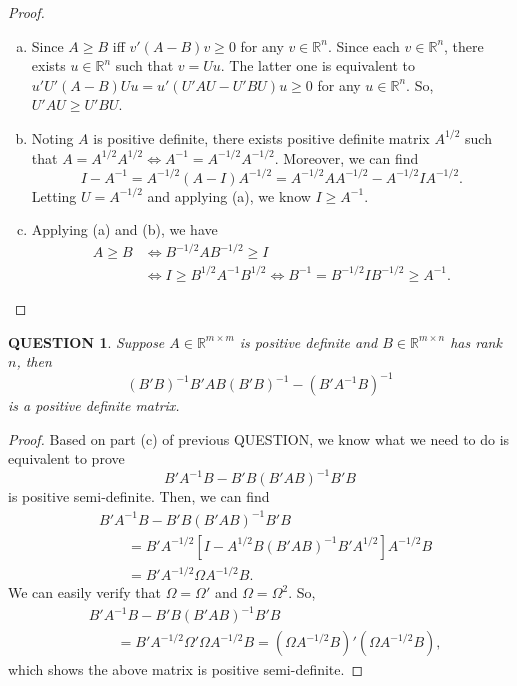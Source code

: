 \documentclass[12pt]{article}
\renewcommand{\(}{\left(}%
\renewcommand{\)}{\right)}%
\renewcommand{\[}{\left[}%
\renewcommand{\]}{\right]}%
\renewcommand{\r}{\mathbb{R}}
\newtheorem{question}{QUESTION}[section]}
\newtheorem{proof}{Proof.}}
\begin{document}
\begin{proof}
	\begin{enumerate}[(a)]
		\item Since $A\geq B$ iff $v'(A-B)v\geq 0$ for any $v\in\r^n$. Since each $v\in\r^n$, there exists $u\in\r^n$ such that $v=Uu$. The latter one is equivalent to $u'U'(A-B)Uu=u'(U'AU-U'BU)u\geq 0$ for any $u\in\r^n$. So, $U'AU\geq U'BU$.
		\item Noting $A$ is positive definite, there exists positive definite matrix $A^{1/2}$ such that $A=A^{1/2}A^{1/2}\Longleftrightarrow A^{-1}=A^{-1/2}A^{-1/2}$. Moreover, we can find
		\begin{equation*}
			I-A^{-1}=A^{-1/2}(A-I)A^{-1/2}=A^{-1/2}AA^{-1/2}-A^{-1/2}IA^{-1/2}.
		\end{equation*}
		Letting $U=A^{-1/2}$ and applying (a), we know $I\geq A^{-1}$.
		\item Applying (a) and (b), we have
		\begin{equation*}
			\begin{split}
				A\geq B&\Longleftrightarrow B^{-1/2}AB^{-1/2}\geq I\\
				&\Longleftrightarrow I\geq B^{1/2}A^{-1}B^{1/2}\Longleftrightarrow B^{-1}=B^{-1/2}IB^{-1/2}\geq A^{-1}.
			\end{split}
		\end{equation*}
	\end{enumerate}
\end{proof}

\begin{question}
	Suppose $A\in \r^{m\times m}$ is positive definite and $B\in \r^{m\times n}$ has rank $n$, then
	\begin{equation*}
		(B'B)^{-1}B'AB(B'B)^{-1}-(B'A^{-1}B)^{-1}
	\end{equation*}
	is a positive definite matrix.
\end{question}
\begin{proof}
	Based on part (c) of previous QUESTION, we know what we need to do is equivalent to prove
	\begin{equation*}
		B'A^{-1}B - B'B(B'AB)^{-1}B'B
	\end{equation*}
	is positive semi-definite. Then, we can find
	\begin{equation*}
		\begin{split}
			&B'A^{-1}B - B'B(B'AB)^{-1}B'B\\
			&\qquad =B'A^{-1/2}[I-A^{1/2}B(B'AB)^{-1}B'A^{1/2}]A^{-1/2}B\\
			&\qquad =B'A^{-1/2}\Omega A^{-1/2}B.
		\end{split}
	\end{equation*}
	We can easily verify that $\Omega=\Omega'$ and $\Omega=\Omega^2$. So,
	\begin{equation*}
		\begin{split}
			&B'A^{-1}B - B'B(B'AB)^{-1}B'B\\
			&\qquad =B'A^{-1/2}\Omega'\Omega A^{-1/2}B=(\Omega A^{-1/2}B)'(\Omega A^{-1/2}B),
		\end{split}
	\end{equation*}
	which shows the above matrix is positive semi-definite.
\end{proof}
\end{document}
